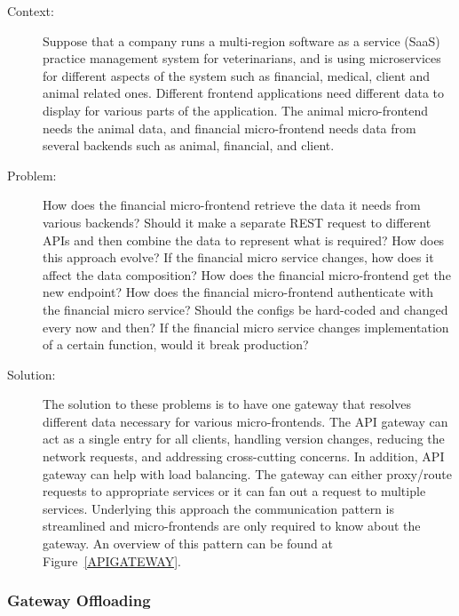 \documentclass{bmcart}
\begin{document}
\begin{description}
  \item[Context:] Suppose that a company runs a multi-region software as a service (SaaS) practice management system for veterinarians, and is using microservices for different aspects of the system such as financial, medical, client and animal related ones. Different frontend applications need different data to display for various parts of the application. The animal micro-frontend needs the animal data, and financial micro-frontend needs data from several backends such as animal, financial, and client. 
  \item[Problem:] How does the financial micro-frontend retrieve the data it needs from various backends? Should it make a separate REST request to different APIs and then combine the data to represent what is required? How does this approach evolve? If the financial micro service changes, how does it affect the data composition? How does the financial micro-frontend get the new endpoint? How does the financial micro-frontend authenticate with the financial micro service? Should the configs be hard-coded and changed every now and then? If the financial micro service changes implementation of a certain function, would it break production?
  \item[Solution:] The solution to these problems is to have one gateway that resolves different data necessary for various micro-frontends. The API gateway can act as a single entry for all clients, handling version changes, reducing the network requests, and addressing cross-cutting concerns. In addition, API gateway can help with load balancing. The gateway can either proxy/route requests to appropriate services or it can fan out a request to multiple services. Underlying this approach the communication pattern is streamlined and micro-frontends are only required to know about the gateway. An overview of this pattern can be found at Figure~\ref{APIGATEWAY}.
  

\end{description}


\subsubsection{Gateway Offloading}
\end{document}
